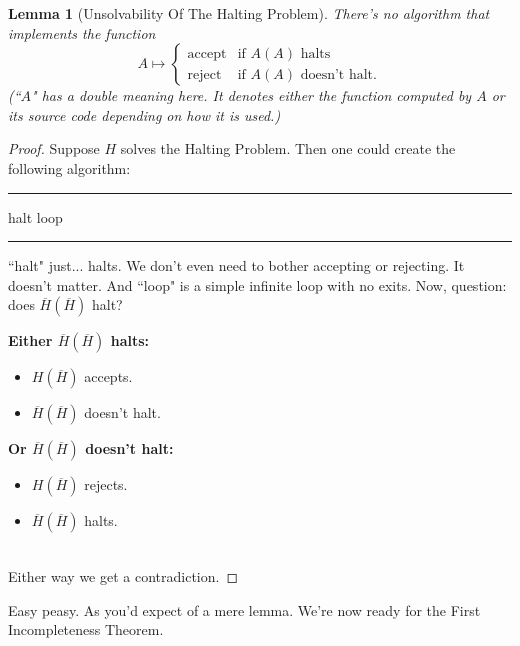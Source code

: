 \documentclass{article}
\newtheorem{lemma}{Lemma}
\newcommand{\nameditem}[1]{\item\textbf{#1}}
\newcommand{\impl}{\item[$\Rightarrow$]}
\newenvironment{algo}{\begin{samepage}\medskip\hrule\begin{algorithmic}[H]}{\end{algorithmic}\hrule\medskip\end{samepage}}
\begin{document}
\begin{lemma}[Unsolvability Of The Halting Problem]
There's no algorithm that implements the function
\[
A \mapsto
\begin{cases}
\text{accept} & \text{if $A(A)$ halts}\\
\text{reject} & \text{if $A(A)$ doesn't halt.}
\end{cases}
\]
(``$A$" has a double meaning here. It denotes either the function computed by $A$ or its source code depending on how it is used.)
\end{lemma}

\begin{proof}
Suppose $H$ solves the Halting Problem. Then one could create the following algorithm:
\begin{algo}
    \State halt
  \EndIf
    \State loop
  \EndIf
\EndFunction
\end{algo}
``halt" just... halts. We don't even need to bother accepting or rejecting. It doesn't matter. And ``loop" is a simple infinite loop with no exits. Now, question: does $\overline{H}(\overline{H})$ halt?\\[0.5em]
\begin{minipage}{0.5\textwidth}
\begin{description}[noitemsep]
\nameditem{Either $\overline{H}(\overline{H})$ halts:} 
\begin{itemize}[noitemsep]
\impl $H(\overline{H})$ accepts.
\impl $\overline{H}(\overline{H})$ doesn't halt. \lightning
\end{itemize}
\end{description}
\end{minipage}
\begin{minipage}{0.5\textwidth}
\begin{description}[noitemsep]
\nameditem{Or $\overline{H}(\overline{H})$ doesn't halt:} 
\begin{itemize}[noitemsep]
\impl $H(\overline{H})$ rejects.
\impl $\overline{H}(\overline{H})$ halts. \lightning
\end{itemize}
\end{description}
\end{minipage}\\[1em]
Either way we get a contradiction.
\end{proof}

Easy peasy. As you'd expect of a mere lemma. We're now ready for the First Incompleteness Theorem.
\end{document}
